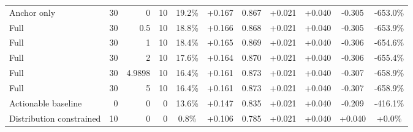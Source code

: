 \begin{table}[htbp]
\begin{tabular}{lrrrccccccc}
Anchor only & 30 & 0 & 10 & 19.2\% & +0.167 & 0.867 & +0.021 & +0.040 & -0.305 & -653.0\% \\
Full & 30 & 0.5 & 10 & 18.8\% & +0.166 & 0.868 & +0.021 & +0.040 & -0.305 & -653.9\% \\
Full & 30 & 1 & 10 & 18.4\% & +0.165 & 0.869 & +0.021 & +0.040 & -0.306 & -654.6\% \\
Full & 30 & 2 & 10 & 17.6\% & +0.164 & 0.870 & +0.021 & +0.040 & -0.306 & -655.4\% \\
Full & 30 & 4.9898 & 10 & 16.4\% & +0.161 & 0.873 & +0.021 & +0.040 & -0.307 & -658.9\% \\
Full & 30 & 5 & 10 & 16.4\% & +0.161 & 0.873 & +0.021 & +0.040 & -0.307 & -658.9\% \\
Actionable baseline & 0 & 0 & 0 & 13.6\% & +0.147 & 0.835 & +0.021 & +0.040 & -0.209 & -416.1\% \\
Distribution constrained & 10 & 0 & 0 & 0.8\% & +0.106 & 0.785 & +0.021 & +0.040 & +0.040 & +0.0\% \\
\bottomrule
\end{tabular}
\end{table}